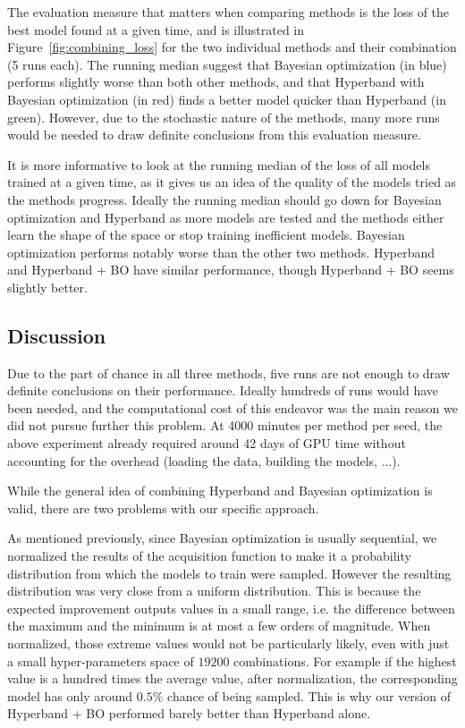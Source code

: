 The evaluation measure that matters when comparing methods is the loss of the best model found at a given time, and is illustrated in Figure~\ref{fig:combining_loss} for the two individual methods and their combination (5 runs each). 
The running median suggest that Bayesian optimization (in blue) performs slightly worse than both other methods, and that Hyperband with Bayesian optimization (in red) finds a better model quicker than Hyperband (in green). However, due to the stochastic nature of the methods, many more runs would be needed to draw definite conclusions from this evaluation measure. 

It is more informative to look at the running median of the loss of all models trained at a given time, as it gives us an idea of the quality of the models tried as the methods progress. Ideally the running median should go down for Bayesian optimization and Hyperband as more models are tested and the methods either learn the shape of the space or stop training inefficient models. Bayesian optimization performs notably worse than the other two methods. Hyperband and Hyperband + BO have similar performance, though Hyperband + BO seems slightly better.

\subsection{Discussion}

Due to the part of chance in all three methods, five runs are not enough to draw definite conclusions on their performance. Ideally hundreds of runs would have been needed, and the computational cost of this endeavor was the main reason we did not pursue further this problem. At 4000 minutes per method per seed, the above experiment already required around 42 days of GPU time without accounting for the overhead (loading the data, building the models, ...).

While the general idea of combining Hyperband and Bayesian optimization is valid, there are two problems with our specific approach. 

As mentioned previously, since Bayesian optimization is usually sequential, we normalized the results of the acquisition function to make it a probability distribution from which the models to train were sampled. However the resulting distribution was very close from a uniform distribution. This is because the expected improvement outputs values in a small range, i.e. the difference between the maximum and the minimum is at most a few orders of magnitude. When normalized, those extreme values would not be particularly likely, even with just a small hyper-parameters space of $19 200$ combinations. For example if the highest value is a hundred times the average value, after normalization, the corresponding model has only around $0.5\%$ chance of being sampled. This is why our version of Hyperband + BO performed barely better than Hyperband alone. 

